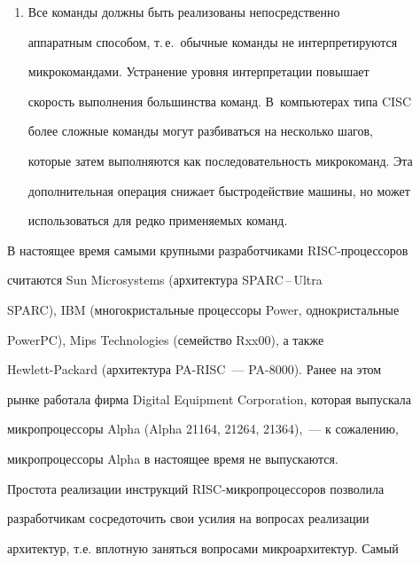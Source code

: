 \begin{enumerate}[1.]
эффективной компиляции лучше иметь небольшой набор простых 


регистровых команд (и, стало быть, быстрых), чем набор сложных 


команд, затрудняющих применение методов оптимизации кода 


транслируемой программы.


 \item Все команды должны быть реализованы  непосредственно 


аппаратным способом, т.\,е.\ обычные команды не интерпретируются 


микрокомандами. Устранение уровня интерпретации повышает 


скорость выполнения большинства команд. В~компьютерах типа CISC 


более сложные команды могут разбиваться на несколько шагов, 


которые затем выполняются как последовательность микрокоманд. Эта 


дополнительная операция снижает быстродействие машины, но может 


использоваться для редко применяемых команд.


 \end{enumerate}





В настоящее время  самыми крупными разработчиками RISC-про\-цес\-со\-ров 


считаются Sun Microsystems (архитектура SPARC\,--\,Ultra 


SPARC), IBM (многокристальные процессоры Power, однокристальные 


PowerPC),  Mips Technologies (семейство Rxx00), а также 


Hewlett-Packard (архитектура PA-RISC~--- PA-8000). Ранее на этом 


рынке работала фирма Digital Equipment Corporation, которая выпускала 


микропроцессоры  Alpha  (Alpha 21164, 21264, 21364),~--- к сожалению, 


микропроцессоры Alpha в настоящее время не выпускаются.





 Простота реализации инструкций RISC-микропроцессоров позволила 


разработчикам сосредоточить свои усилия на вопросах реализации 


архитектур, т.е. вплотную заняться вопросами микроархитектур. Самый 



